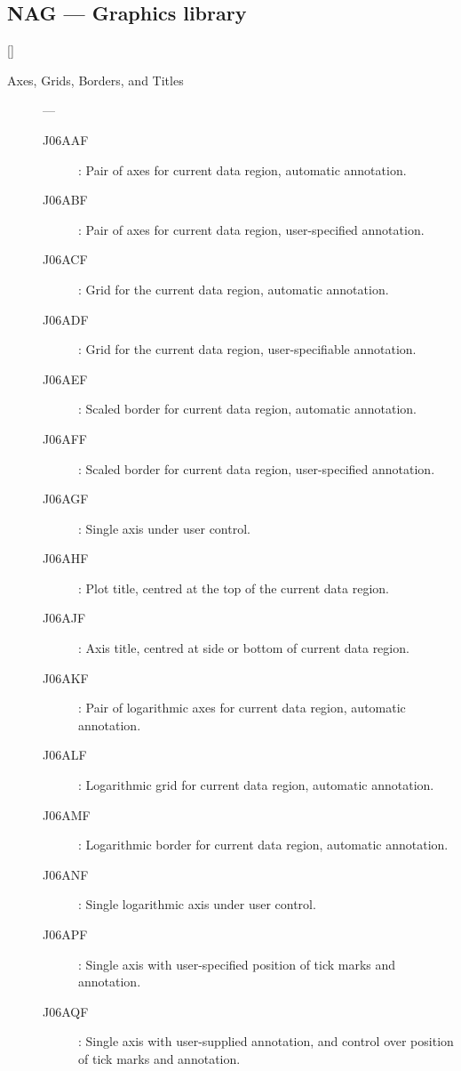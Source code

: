 \newpage

\subsection{NAG --- Graphics library}

\vspace{-9mm}

\hfill []

\vspace{2mm}

\begin{description}

\item [Axes, Grids, Borders, and Titles] ---

\begin{description}
\item [J06AAF] : Pair of axes for current data region, automatic annotation.
\item [J06ABF] : Pair of axes for current data region, user-specified annotation.
\item [J06ACF] : Grid for the current data region, automatic annotation.
\item [J06ADF] : Grid for the current data region, user-specifiable annotation.
\item [J06AEF] : Scaled border for current data region, automatic annotation.
\item [J06AFF] : Scaled border for current data region, user-specified annotation.
\item [J06AGF] : Single axis under user control.
\item [J06AHF] : Plot title, centred at the top of the current data region.
\item [J06AJF] : Axis title, centred at side or bottom of current data region.
\item [J06AKF] : Pair of logarithmic axes for current data region, automatic annotation.
\item [J06ALF] : Logarithmic grid for current data region, automatic annotation.
\item [J06AMF] : Logarithmic border for current data region, automatic annotation.
\item [J06ANF] : Single logarithmic axis under user control.
\item [J06APF] : Single axis with user-specified position of tick marks and annotation.
\item [J06AQF] : Single axis with user-supplied annotation, and control over position of tick marks and annotation.
\end{description}


\end{description}
